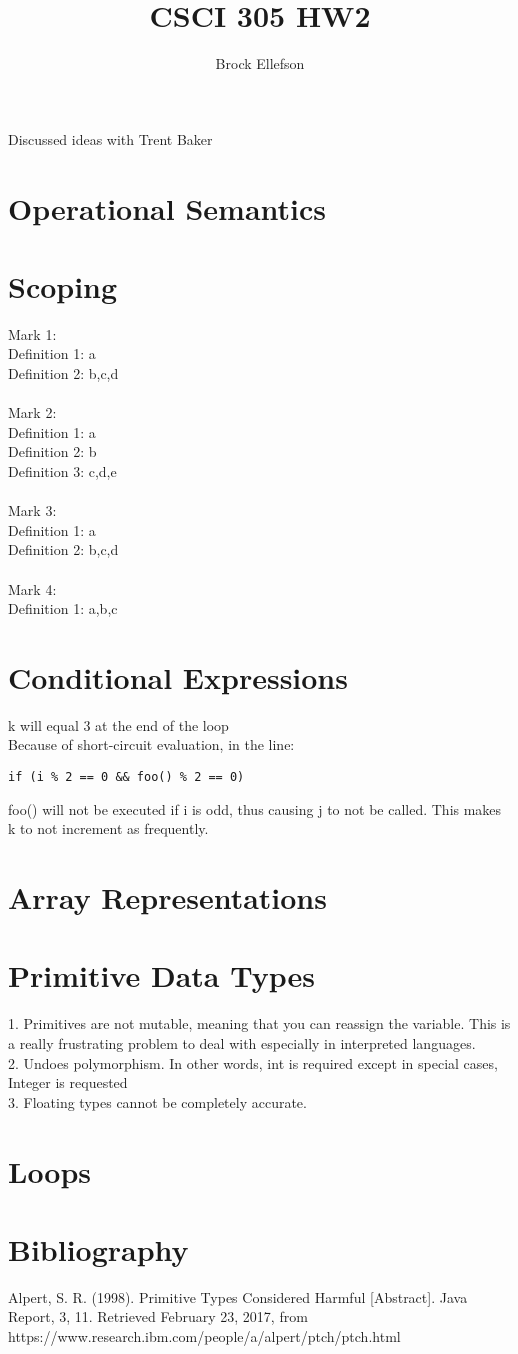 \documentclass[10pt,letterpaper]{article}
\author{Brock Ellefson}
\title{CSCI 305 HW2}
\begin{document}
\maketitle
\* Discussed ideas with Trent Baker \*
\section{Operational Semantics}

\section{Scoping}
Mark 1:\\
Definition 1: a\\
Definition 2: b,c,d\\\\
Mark 2:\\
Definition 1: a\\
Definition 2: b\\
Definition 3: c,d,e\\\\
Mark 3:\\
Definition 1: a\\
Definition 2: b,c,d\\\\
Mark 4:\\
Definition 1: a,b,c
\section{Conditional Expressions}
k will equal 3 at the end of the loop\\
Because of short-circuit evaluation, in the line:
\begin{verbatim}
if (i % 2 == 0 && foo() % 2 == 0)
\end{verbatim}
foo() will not be executed if i is odd, thus causing j to not be called. This makes k to not increment as frequently. 
\section{Array Representations}

\section{Primitive Data Types}
1. Primitives are not mutable, meaning that you can reassign the variable. This is a really frustrating problem to deal with especially in interpreted languages. \\
2. Undoes polymorphism. In other words, int is required except in special cases, Integer is requested \\
3. Floating types cannot be completely accurate. 
\section{Loops}

\section{Bibliography}
Alpert, S. R. (1998). Primitive Types Considered Harmful [Abstract]. Java Report, 3, 11. Retrieved February 23, 2017, from https://www.research.ibm.com/people/a/alpert/ptch/ptch.html
\end{document}
